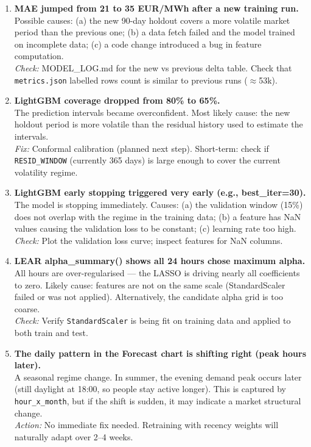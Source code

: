 \documentclass[12pt, a4paper, oneside]{memoir}
\newcommand{\EUR}{EUR/MWh}
\newcommand{\code}[1]{\texttt{\footnotesize #1}}
\begin{document}
\begin{enumerate}[leftmargin=*, label=\textbf{Scenario \arabic*.}]

\item \textbf{MAE jumped from 21 to 35 \EUR{} after a new training run.}\\
  Possible causes: (a) the new 90-day holdout covers a more volatile market period
  than the previous one; (b) a data fetch failed and the model trained on incomplete
  data; (c) a code change introduced a bug in feature computation.\\
  \textit{Check:} MODEL\_LOG.md for the new vs previous delta table. Check that
  \code{metrics.json} labelled rows count is similar to previous runs ($\approx$53k).

\item \textbf{LightGBM coverage dropped from 80\% to 65\%.}\\
  The prediction intervals became overconfident. Most likely cause: the new holdout
  period is more volatile than the residual history used to estimate the intervals.\\
  \textit{Fix:} Conformal calibration (planned next step). Short-term: check if
  \code{RESID\_WINDOW} (currently 365 days) is large enough to cover the current
  volatility regime.

\item \textbf{LightGBM early stopping triggered very early (e.g., best\_iter=30).}\\
  The model is stopping immediately. Causes: (a) the validation window (15\%) does
  not overlap with the regime in the training data; (b) a feature has NaN values
  causing the validation loss to be constant; (c) learning rate too high.\\
  \textit{Check:} Plot the validation loss curve; inspect features for NaN columns.

\item \textbf{LEAR alpha\_summary() shows all 24 hours chose maximum alpha.}\\
  All hours are over-regularised --- the LASSO is driving nearly all coefficients to
  zero. Likely cause: features are not on the same scale (StandardScaler failed or
  was not applied). Alternatively, the candidate alpha grid is too coarse.\\
  \textit{Check:} Verify \code{StandardScaler} is being fit on training data and
  applied to both train and test.

\item \textbf{The daily pattern in the Forecast chart is shifting right (peak hours later).}\\
  A seasonal regime change. In summer, the evening demand peak occurs later (still
  daylight at 18:00, so people stay active longer). This is captured by
  \code{hour\_x\_month}, but if the shift is sudden, it may indicate a market
  structural change.\\
  \textit{Action:} No immediate fix needed. Retraining with recency weights will
  naturally adapt over 2--4 weeks.


\end{enumerate}
\end{document}
